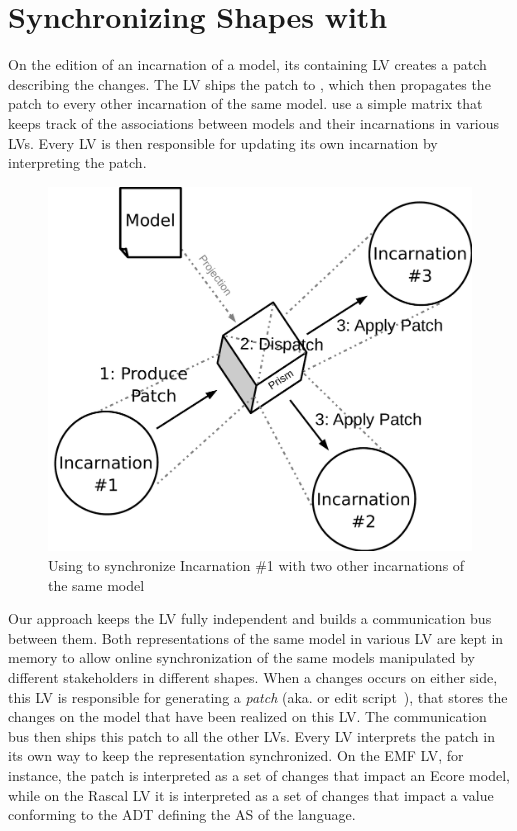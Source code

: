 \section{Synchronizing Shapes with \prism}
\label{sec:prism}


On the edition of an incarnation of a model, its containing LV creates a patch describing the changes. The LV ships the patch to \prism, which then propagates the patch to every other incarnation of the same model. \prism use a simple matrix that keeps track of the associations between models and their incarnations in various LVs.
Every LV is then responsible for updating its own incarnation by interpreting the patch.

\begin{figure}[bt]
	\centering
	\includegraphics[width=.6\columnwidth]{figures/prism}
	\caption{Using \prism to synchronize Incarnation \#1 with two other incarnations of the same model}
	\label{fig:prism}
\end{figure}

Our approach keeps the LV fully independent and builds a communication bus between them.
Both representations of the same model in various LV are kept in memory to allow online synchronization of the same models manipulated by different stakeholders in different shapes.
When a changes occurs on either side, this LV is responsible for generating a \emph{patch} (aka. \de or edit script~\cite{rozen2017towards}), that stores the changes on the model that have been realized on this LV.
The communication bus then ships this patch to all the other LVs.
Every LV interprets the patch in its own way to keep the representation synchronized.
On the EMF LV, for instance, the patch is interpreted as a set of changes that impact an Ecore model, while on the Rascal LV it is interpreted as a set of changes that impact a value conforming to the ADT defining the AS of the language.

